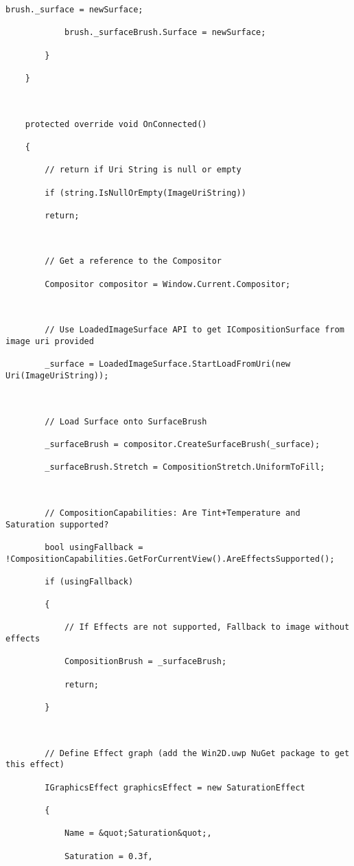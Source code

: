 \begin{lstlisting}[style=CSharpStyle]
			brush._surface = newSurface;
			
			brush._surfaceBrush.Surface = newSurface;
			
		}
		
	}
	
	
	
	protected override void OnConnected()
	
	{
		
		// return if Uri String is null or empty
		
		if (string.IsNullOrEmpty(ImageUriString))
		
		return;
		
		
		
		// Get a reference to the Compositor
		
		Compositor compositor = Window.Current.Compositor;
		
		
		
		// Use LoadedImageSurface API to get ICompositionSurface from image uri provided
		
		_surface = LoadedImageSurface.StartLoadFromUri(new Uri(ImageUriString));
		
		
		
		// Load Surface onto SurfaceBrush
		
		_surfaceBrush = compositor.CreateSurfaceBrush(_surface);
		
		_surfaceBrush.Stretch = CompositionStretch.UniformToFill;
		
		
		
		// CompositionCapabilities: Are Tint+Temperature and Saturation supported?
		
		bool usingFallback = !CompositionCapabilities.GetForCurrentView().AreEffectsSupported();
		
		if (usingFallback)
		
		{
			
			// If Effects are not supported, Fallback to image without effects
			
			CompositionBrush = _surfaceBrush;
			
			return;
			
		}
		
		
		
		// Define Effect graph (add the Win2D.uwp NuGet package to get this effect)
		
		IGraphicsEffect graphicsEffect = new SaturationEffect
		
		{
			
			Name = &quot;Saturation&quot;,
			
			Saturation = 0.3f,
			

\end{lstlisting}
